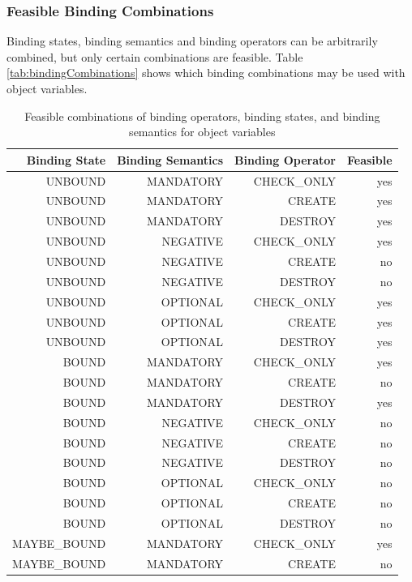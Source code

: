 \subsubsection{Feasible Binding Combinations}

Binding states, binding semantics and binding operators can be
arbitrarily combined, but only certain combinations are feasible. 
Table \ref{tab:bindingCombinations} shows which binding combinations may be
used with object variables.

\begin{table}[htbp]
  \centering
  \caption{Feasible combinations of binding operators, binding states, and
  binding semantics for object variables}
    \begin{tabular}{|r|r|r|r|}
    \hline
    \textbf{Binding State} & \textbf{Binding Semantics} & \textbf{Binding
    Operator} & \textbf{Feasible} \\
    \hline
    UNBOUND & MANDATORY & CHECK\_ONLY & yes \\
    UNBOUND & MANDATORY & CREATE & yes \\
    UNBOUND & MANDATORY & DESTROY & yes \\
    UNBOUND & NEGATIVE & CHECK\_ONLY & yes \\
    UNBOUND & NEGATIVE & CREATE & no \\
    UNBOUND & NEGATIVE & DESTROY & no \\
    UNBOUND & OPTIONAL & CHECK\_ONLY & yes \\
    UNBOUND & OPTIONAL & CREATE & yes \\
    UNBOUND & OPTIONAL & DESTROY & yes \\
    \hline
    BOUND & MANDATORY & CHECK\_ONLY & yes \\
    BOUND & MANDATORY & CREATE & no \\
    BOUND & MANDATORY & DESTROY & yes \\
    BOUND & NEGATIVE & CHECK\_ONLY & no \\
    BOUND & NEGATIVE & CREATE & no \\
    BOUND & NEGATIVE & DESTROY & no \\
    BOUND & OPTIONAL & CHECK\_ONLY & no \\
    BOUND & OPTIONAL & CREATE & no \\
    BOUND & OPTIONAL & DESTROY & no \\
    \hline
    MAYBE\_BOUND & MANDATORY & CHECK\_ONLY & yes \\
    MAYBE\_BOUND & MANDATORY & CREATE & no \\

\end{tabular}
\end{table}
